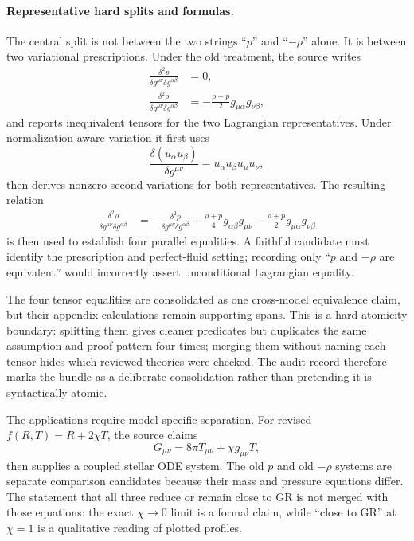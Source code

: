 \paragraph{Representative hard splits and formulas.}
The central split is not between the two strings ``$p$'' and ``$-\rho$'' alone. It is between two variational prescriptions. Under the old treatment, the source writes
\begin{align}
\frac{\delta^2p}{\delta g^{\mu\nu}\delta g^{\alpha\beta}}&=0,\\
\frac{\delta^2\rho}{\delta g^{\mu\nu}\delta g^{\alpha\beta}}
&=-\frac{\rho+p}{2}g_{\mu\alpha}g_{\nu\beta},
\end{align}
and reports inequivalent tensors for the two Lagrangian representatives. Under normalization-aware variation it first uses
\[
\frac{\delta(u_\alpha u_\beta)}{\delta g^{\mu\nu}}
=u_\alpha u_\beta u_\mu u_\nu,
\]
then derives nonzero second variations for both representatives. The resulting relation
\begin{align}
\frac{\delta^2\rho}{\delta g^{\mu\nu}\delta g^{\alpha\beta}}
&=-\frac{\delta^2p}{\delta g^{\mu\nu}\delta g^{\alpha\beta}}
 +\frac{\rho+p}{4}g_{\alpha\beta}g_{\mu\nu}
 -\frac{\rho+p}{2}g_{\mu\alpha}g_{\nu\beta}
\end{align}
is then used to establish four parallel equalities. A faithful candidate must identify the prescription and perfect-fluid setting; recording only ``$p$ and $-\rho$ are equivalent'' would incorrectly assert unconditional Lagrangian equality.

The four tensor equalities are consolidated as one cross-model equivalence claim, but their appendix calculations remain supporting spans. This is a hard atomicity boundary: splitting them gives cleaner predicates but duplicates the same assumption and proof pattern four times; merging them without naming each tensor hides which reviewed theories were checked. The audit record therefore marks the bundle as a deliberate consolidation rather than pretending it is syntactically atomic.

The applications require model-specific separation. For revised $f(R,T)=R+2\chi T$, the source claims
\[
G_{\mu\nu}=8\pi T_{\mu\nu}+\chi g_{\mu\nu}T,
\]
then supplies a coupled stellar ODE system. The old $p$ and old $-\rho$ systems are separate comparison candidates because their mass and pressure equations differ. The statement that all three reduce or remain close to GR is not merged with those equations: the exact $\chi\to0$ limit is a formal claim, while ``close to GR'' at $\chi=1$ is a qualitative reading of plotted profiles.

